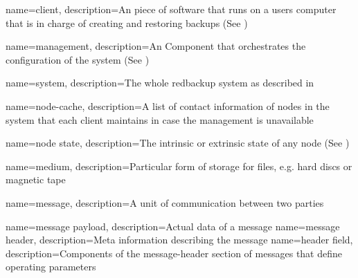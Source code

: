 {
    name={client},
    description={An piece of software that runs on a users computer that is in charge of creating and restoring backups (See )}
}

{
    name={management},
    description={An Component that orchestrates the configuration of the system (See )}
}

{
    name={system},
    description={The whole redbackup system as described in }
}

{
    name={node-cache},
    description={A list of contact information of nodes in the system that each client maintains in case the management is unavailable}
}

{
    name={node state},
    description={The intrinsic or extrinsic state of any node (See )}
}

{
    name={medium},
    description={Particular form of storage for files, e.g. hard discs or magnetic tape}
}

{
    name={message},
    description={A unit of communication between two parties}
}

{
    name={message payload},
    description={Actual data of a message}
}
{
    name={message header},
    description={Meta information describing the message}
}
{
    name={header field},
    description={Components of the \gls{message-header} section of \glspl{message} that define operating parameters}
}

